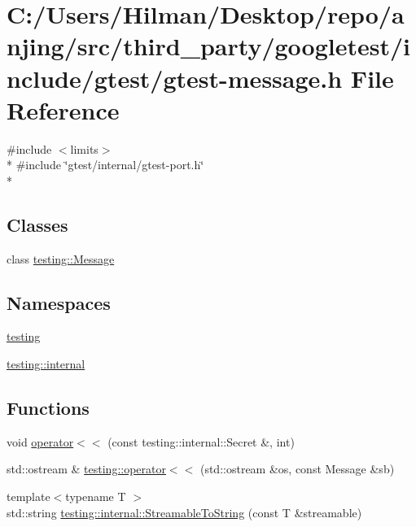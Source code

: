 \hypertarget{gtest-message_8h}{}\section{C\+:/\+Users/\+Hilman/\+Desktop/repo/anjing/src/third\+\_\+party/googletest/include/gtest/gtest-\/message.h File Reference}
\label{gtest-message_8h}
{\ttfamily \#include $<$limits$>$}\\*
{\ttfamily \#include \char`\"{}gtest/internal/gtest-\/port.\+h\char`\"{}}\\*
\subsection*{Classes}
\begin{DoxyCompactItemize}
\item 
class \hyperlink{classtesting_1_1_message}{testing\+::\+Message}
\end{DoxyCompactItemize}
\subsection*{Namespaces}
\begin{DoxyCompactItemize}
\item 
 \hyperlink{namespacetesting}{testing}
\item 
 \hyperlink{namespacetesting_1_1internal}{testing\+::internal}
\end{DoxyCompactItemize}
\subsection*{Functions}
\begin{DoxyCompactItemize}
\item 
void \hyperlink{gtest-message_8h_ae8f0c86e5c506587b62315e24a918563}{operator$<$$<$} (const testing\+::internal\+::\+Secret \&, int)
\item 
std\+::ostream \& \hyperlink{namespacetesting_a7b802e532fd68749765cb7dc156130db}{testing\+::operator$<$$<$} (std\+::ostream \&os, const Message \&sb)
\item 
{\footnotesize template$<$typename T $>$ }\\std\+::string \hyperlink{namespacetesting_1_1internal_aad4beed95d0846e6ffc5da0978ef3bb9}{testing\+::internal\+::\+Streamable\+To\+String} (const T \&streamable)
\end{DoxyCompactItemize}


